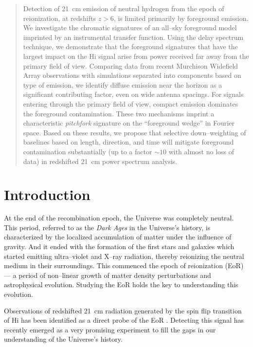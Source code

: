 \documentclass[preprint2,iop,numberedappendix]{emulateapj}
\begin{document}
\begin{abstract}

Detection of 21~cm emission of neutral hydrogen from the epoch of reionization, at redshifts $z>6$, is limited primarily by foreground emission.  We investigate the chromatic signatures of an all--sky foreground model imprinted by an instrumental transfer function.  Using the delay spectrum technique, we demonstrate that the foreground signatures that have the largest impact on the H{\sc i} signal arise from power received far away from the primary field of view. Comparing data from recent Murchison Widefield Array observations with simulations separated into components based on type of emission, we identify diffuse emission near the horizon as a significant contributing factor, even on wide antenna spacings. For signals entering through the primary field of view, compact emission dominates the foreground contamination. These two mechanisms imprint a characteristic {\it pitchfork} signature on the ``foreground wedge'' in Fourier space. Based on these results, we propose that selective down--weighting of baselines based on length, direction, and time will mitigate foreground contamination substantially (up to a factor $\sim 10$ with almost no loss of data) in redshifted 21~cm power spectrum analysis.

\end{abstract}
 

\section{Introduction}\label{intro}

At the end of the recombination epoch, the Universe was completely neutral. This period, referred to as the {\it Dark Ages} in the Universe's history, is characterized by the localized accumulation of matter under the influence of gravity. And it ended with the formation of the first stars and galaxies which started emitting ultra--violet and X--ray radiation, thereby reionizing the neutral medium in their surroundings. This commenced the epoch of reionization (EoR) --- a period of non--linear growth of matter density perturbations and astrophysical evolution. Studying the EoR holds the key to understanding this evolution. 

Observations of redshifted 21~cm radiation generated by the spin flip transition of H{\sc i} has been identified as a direct probe of the EoR \citep{sun72,sco90,mad97,toz00,ili02}. Detecting this signal has recently emerged as a very promising experiment to fill the gaps in our understanding of the Universe's history.  
\end{document}
